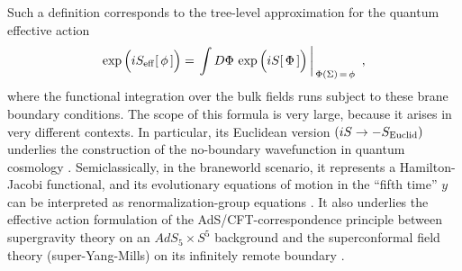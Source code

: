 \documentclass[a4paper,12pt]{article}
\begin{document}
Such a definition corresponds to the tree-level approximation for
the quantum effective action
    \begin{equation}
    \exp\Big(iS_{\rm eff}[\,\phi\,]\Big)=
    \left.\int D\Phi \,\exp\Big(iS[\,\Phi\,]\Big)\,
    \right|_{\,\Phi(\Sigma)\,=\,\phi}\,\, ,         \label{00.2}
    \end{equation}
where the functional integration over the bulk fields runs subject
to these brane boundary conditions. The scope of this formula is
very large, because it arises in very different contexts. In
particular, its Euclidean version $(iS\to -S_{\rm Euclid})$
underlies the construction of the no-boundary wavefunction in
quantum cosmology \cite{HH}. Semiclassically, in the braneworld
scenario, it represents a Hamilton-Jacobi functional, and its
evolutionary equations of motion in the ``fifth time'' $y$ can be
interpreted as renormalization-group equations \cite{Verlinde}. It
also underlies the effective action formulation of the
AdS/CFT-correspondence principle between supergravity theory on an
$AdS_5\times S^5$ background and the superconformal field theory
(super-Yang-Mills) on its infinitely remote boundary
\cite{AdS/CFT,GKR,HHR1}.
\end{document}
